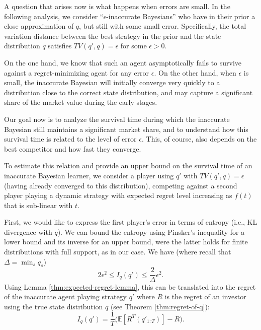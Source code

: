 A question that arises now is what happens when errors are small.  
In the following analysis, we consider ``$\epsilon$-inaccurate Bayesians'' who have in their prior a close approximation of $q$, but still with some small error. Specifically, the total variation distance between the best strategy in the prior and the state distribution $q$ satisfies $TV(q', q) = \epsilon$ for some $\epsilon > 0$. 

On the one hand, we know that such an agent asymptotically fails to survive against a regret-minimizing agent for any error $\epsilon$. On the other hand, when $\epsilon$ is small, the inaccurate Bayesian will initially converge very quickly to a distribution close to the correct state distribution, and may capture a significant share of the market value during the early stages. 

Our goal now is to analyze the survival time during which the inaccurate Bayesian still maintains a significant market share, and to understand how this survival time is related to the level of error $\epsilon$. This, of course, also depends on the best competitor and how fast they converge.

To estimate this relation and provide an upper bound on the survival time of an inaccurate Bayesian learner, we consider a player using $q'$ with $TV(q', q) = \epsilon$ (having already converged to this distribution), competing against a second player playing a dynamic strategy with expected regret level increasing as $f(t)$ that is sub-linear with $t$.

First, we would like to express the first player's error in terms of entropy (i.e., KL divergence with $q$). We can bound the entropy using Pinsker's inequality \cite{pinsker1964information} for a lower bound and its inverse for an upper bound, were the latter holds for finite distributions with full support, as in our case. We have (where recall that $\Delta = \min_s q_s$)
\[
2\epsilon^2 \leq 
I_q(q')
\leq \frac{2}{\Delta} \epsilon^2.
\]
Using Lemma \ref{thm:expected-regret-lemma}, this can be translated into the regret of the inaccurate agent playing strategy $q'$ where $R$ is the regret of an investor using the true state distribution $q$ (see Theorem \ref{thm:regret-of-q}): 
\[
I_q(q')
= \frac{1}{T} \big(\mathbb{E}[R^{T}(q'_{1:T})] - R \big).
\]

